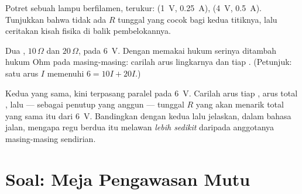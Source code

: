 \begin{exercise}[$\star\star$]\label{exo:g8:ohms-law:10}
Potret sebuah lampu berfilamen, terukur: (\qty{1}{V},
\qty{0.25}{A}), (\qty{4}{V}, \qty{0.5}{A}). Tunjukkan bahwa tidak ada
$R$ tunggal yang cocok bagi kedua titiknya, lalu ceritakan kisah
fisika di balik pembelokannya.
\end{exercise}

\begin{exercise}[$\star\star$]\label{exo:g8:ohms-law:11}
Dua  , $10\,\Omega$ dan $20\,\Omega$, pada
\qty{6}{V}. Dengan memakai hukum serinya ditambah hukum Ohm pada
masing-masing: carilah arus lingkarnya dan  tiap .
(Petunjuk: satu arus $I$ memenuhi $6 = 10 I + 20 I$.)
\end{exercise}

\begin{exercise}[$\star\star\star$]\label{exo:g8:ohms-law:12}
Kedua  yang sama, kini terpasang paralel pada \qty{6}{V}.
Carilah arus tiap , arus total , lalu --- sebagai
penutup yang anggun ---  tunggal $R$ yang akan menarik total
yang sama itu dari \qty{6}{V}. Bandingkan dengan kedua 
lalu jelaskan, dalam bahasa jalan, mengapa regu berdua itu melawan
\emph{lebih sedikit} daripada anggotanya masing-masing sendirian.
\end{exercise}

\section{Soal: Meja Pengawasan Mutu}

